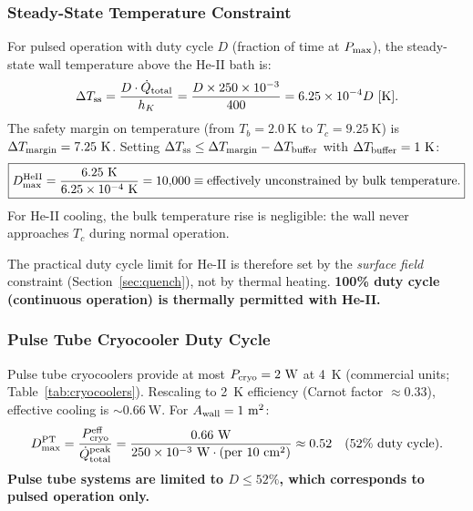 \documentclass[aps,prd,twocolumn,superscriptaddress]{revtex4-2}
\newcommand{\Pmax}{P_{\rm max}}
\begin{document}
\subsubsection{Steady-State Temperature Constraint}

For pulsed operation with duty cycle $D$ (fraction of time at $\Pmax$),
the steady-state wall temperature above the He-II bath is:
\begin{equation}
\Delta T_{\rm ss} = \frac{D \cdot \dot{Q}_{\rm total}}{h_K}
= \frac{D \times 250\times 10^{-3}}{400} = 6.25\times 10^{-4} D~[\mathrm{K}].
\end{equation}
The safety margin on temperature (from $T_b = 2.0~\mathrm{K}$ to
$T_c = 9.25~\mathrm{K}$) is $\Delta T_{\rm margin} = 7.25~\mathrm{K}$.
Setting $\Delta T_{\rm ss} \leq \Delta T_{\rm margin} - \Delta T_{\rm buffer}$
with $\Delta T_{\rm buffer} = 1~\mathrm{K}$:
\begin{equation}
\boxed{D_{\rm max}^{\rm HeII} = \frac{6.25~\mathrm{K}}{6.25\times 10^{-4}~\mathrm{K}}
= 10{,}000 \equiv \text{effectively unconstrained by bulk temperature.}}
\end{equation}
For He-II cooling, the bulk temperature rise is negligible: the wall
never approaches $T_c$ during normal operation.

The practical duty cycle limit for He-II is therefore set by the
\emph{surface field} constraint (Section~\ref{sec:quench}), not by
thermal heating.  \textbf{100\% duty cycle (continuous operation) is
thermally permitted with He-II.}

\subsubsection{Pulse Tube Cryocooler Duty Cycle}

Pulse tube cryocoolers provide at most $P_{\rm cryo} = 2~\mathrm{W}$
at 4~K (commercial units; Table~\ref{tab:cryocoolers}).  Rescaling to
2~K efficiency (Carnot factor $\approx 0.33$), effective cooling is
$\sim 0.66~\mathrm{W}$.  For $A_{\rm wall} = 1~\mathrm{m^2}$:
\begin{equation}
D_{\rm max}^{\rm PT} = \frac{P_{\rm cryo}^{\rm eff}}{\dot{Q}_{\rm total}^{\rm peak}}
= \frac{0.66~\mathrm{W}}{250\times 10^{-3}~\mathrm{W}\cdot
\text{(per }10~\mathrm{cm^2})}
\approx 0.52 \quad (52\%~\text{duty cycle}).
\end{equation}
\textbf{Pulse tube systems are limited to $D \leq 52\%$, which
corresponds to pulsed operation only.}
\end{document}
